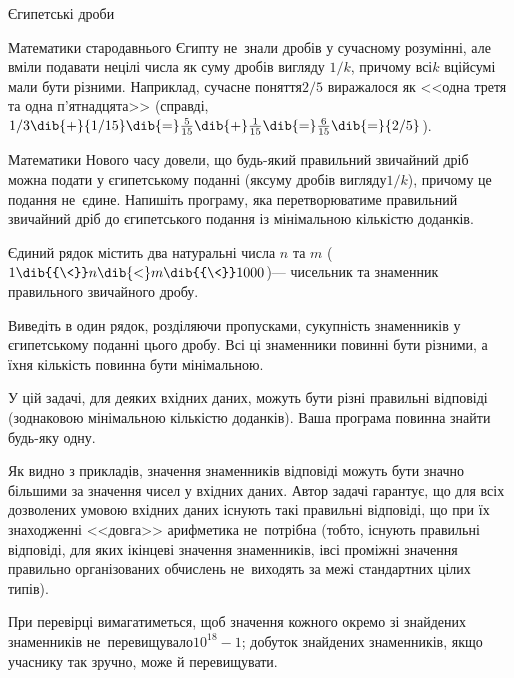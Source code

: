 \begin{problemAllDefault}{Єгипетські дроби}

Математики стародавнього Єгипту не~знали дробів у сучасному розумінні, але вміли подавати нецілі числа як суму дробів вигляду $1/k$, причому всі\nolinebreak[3] $k$ в\nolinebreak[3] цій\nolinebreak[2] сумі мали бути різними. Наприклад, сучасне поняття\nolinebreak[3] $2/5$ виражалося як <<одна третя та одна п’ятнадцята>> (справді, 
${1/3}\dib{{+}}{1/15}\dib{{=}}\frac{5}{15}\dib{{+}}\frac{1}{15}\dib{{=}}\frac{6}{15}\dib{{=}}{2/5}$).

Математики Нового часу довели, що будь-який правильний звичайний дріб можна подати у єгипетському поданні (як\nolinebreak[3] суму дробів вигляду\nolinebreak[3] $1/k$), причому це подання не~єдине. Напишіть програму, яка перетворюватиме правильний звичайний дріб до єгипетського подання із мінімальною кількістю доданків. 

\InputFile
Єдиний рядок містить два натуральні числа $n$ та $m$ ($1\dib{{\<}}n\dib{{<}}m\dib{{\<}}1000$)\nolinebreak[3] --- чисельник та знаменник правильного звичайного дробу. 

\OutputFile
Виведіть в один рядок, розділяючи пропусками, сукупність знаменників у єгипетському поданні цього дробу. Всі ці знаменники повинні бути різними, а їхня кількість повинна бути мінімальною.

\Examples

\begin{example}
%
%
\end{example}

\end{problemAllDefault}

\Notes
У цій задачі, для деяких вхідних даних, можуть бути різні правильні відповіді (з\nolinebreak[3] однаковою мінімальною кількістю доданків). Ваша програма повинна знайти будь-яку одну.

Як видно з прикладів, значення знаменників відповіді можуть бути значно більшими за значення чисел у вхідних даних.
Автор задачі гарантує, що для всіх дозволених умовою вхідних даних існують такі правильні відповіді, що при їх знаходженні <<довга>> арифметика не~потрібна (тобто, існують правильні відповіді, для яких і\nolinebreak[3] кінцеві значення знаменників, і\nolinebreak[3] всі проміжні значення правильно організованих обчислень не~виходять за межі стандартних цілих типів). 

При перевірці вимагатиметься, щоб значення кожного окремо зі знайдених знаменників не~перевищувало\nolinebreak[3] ${10^{18}-1}$; добуток знайдених знаменників, якщо учаснику так зручно, може й перевищувати.